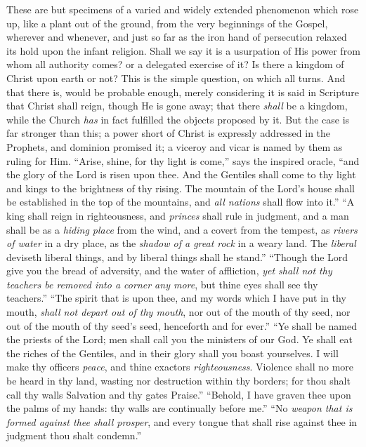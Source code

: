 These are but specimens of a varied and widely extended phenomenon
which rose up, like a plant out of the ground, from the very
beginnings of the Gospel, wherever and whenever, and just so far as
the iron hand of persecution relaxed its hold upon the infant
religion. Shall we say it is a usurpation of His power from whom all
authority comes? or a delegated exercise of it? Is there a kingdom of
Christ upon earth or not? This is the simple question, on which all
turns. And that there is, would be probable enough, merely considering
it is said in Scripture that Christ shall reign, though He is gone
away; that there \emph{shall} be a kingdom, while the Church \emph{has}
in fact fulfilled the objects proposed by it. But the case is far
stronger than this; a power short of Christ is expressly addressed in
the Prophets, and dominion promised it; a viceroy and vicar is named
by them as ruling for Him. ``Arise, shine, for thy light is
come,'' says the inspired oracle, ``and the glory of the Lord
is risen upon thee. And the Gentiles shall come to thy light and kings
to the brightness of thy rising. The mountain of the Lord's house
shall be established in the top of the mountains, and \emph{all nations}
shall flow into it.'' ``A king shall reign in righteousness,
and \emph{princes} shall rule in judgment, and a man shall be as a \emph{hiding
place} from the wind, and a covert from the tempest, as \emph{rivers
of water} in a dry place, as the \emph{shadow of a great rock} in
a weary land. The \emph{liberal} deviseth liberal things, and by
liberal things shall he stand.'' ``Though the Lord give you
the bread of adversity, and the water of affliction, \emph{yet shall not
thy teachers be removed into a corner any more}, but thine eyes
shall see thy teachers.'' ``The spirit that is upon thee, and
my words which I have put in thy mouth, \emph{shall not depart out of thy
mouth}, nor out of the mouth of thy seed, nor out of the mouth of
thy seed's seed, henceforth and for ever.'' ``Ye shall be
named the priests of the Lord; men shall call you the ministers of our
God. Ye shall eat the riches of the Gentiles, and in their glory shall
you boast yourselves. I will make thy officers \emph{peace}, and thine
exactors \emph{righteousness}. Violence shall no more be heard in thy
land, wasting nor destruction within thy borders; for thou shalt call
thy walls Salvation and thy gates Praise.'' ``Behold, I have
graven thee upon the palms of my hands: thy walls are continually
before me.'' ``No \emph{weapon that is formed against thee shall
prosper}, and every tongue that shall rise against thee in judgment
thou shalt condemn.''

